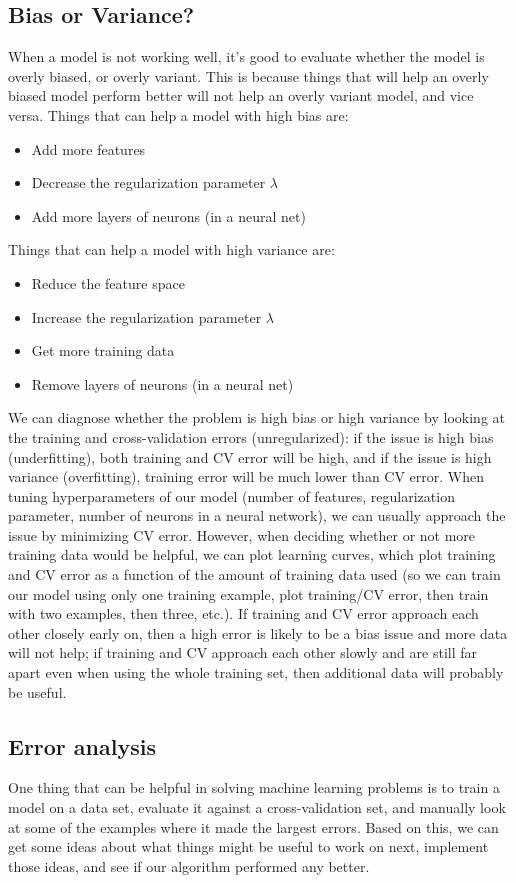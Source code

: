 \documentclass{article}
\begin{document}
\subsection{Bias or Variance?}
When a model is not working well, it's good to evaluate whether the model is overly biased, or overly variant. This is because things that will help an overly biased model perform better will not help an overly variant model, and vice versa. Things that can help a model with high bias are:
\begin{itemize}
\item Add more features
\item Decrease the regularization parameter $\lambda$
\item Add more layers of neurons (in a neural net)
\end{itemize}
Things that can help a model with high variance are:
\begin{itemize}
\item Reduce the feature space
\item Increase the regularization parameter $\lambda$
\item Get more training data
\item Remove layers of neurons (in a neural net)
\end{itemize}
We can diagnose whether the problem is high bias or high variance by looking at the training and cross-validation errors (unregularized): if the issue is high bias (underfitting), both training and CV error will be high, and if the issue is high variance (overfitting), training error will be much lower than CV error. When tuning hyperparameters of our model (number of features, regularization parameter, number of neurons in a neural network), we can usually approach the issue by minimizing CV error. However, when deciding whether or not more training data would be helpful, we can plot learning curves, which plot training and CV error as a function of the amount of training data used (so we can train our model using only one training example, plot training/CV error, then train with two examples, then three, etc.). If training and CV error approach each other closely early on, then a high error is likely to be a bias issue and more data will not help; if training and CV approach each other slowly and are still far apart even when using the whole training set, then additional data will probably be useful.

\subsection{Error analysis}
One thing that can be helpful in solving machine learning problems is to train a model on a data set, evaluate it against a cross-validation set, and manually look at some of the examples where it made the largest errors. Based on this, we can get some ideas about what things might be useful to work on next, implement those ideas, and see if our algorithm performed any better.
\end{document}
